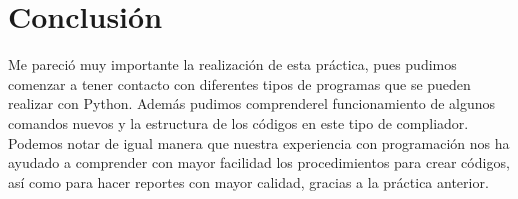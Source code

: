 \documentclass[12 pt,twocolumn]{article}
\begin{document}
\section{\small Conclusión}
Me pareció muy importante la realización de esta práctica, pues pudimos comenzar a tener contacto con diferentes tipos de programas que se pueden realizar con Python. Además pudimos comprenderel funcionamiento de algunos comandos nuevos y la estructura de los códigos en este tipo de compliador. Podemos notar de igual manera que nuestra experiencia con programación nos ha ayudado a comprender con mayor facilidad los procedimientos para crear códigos, así como para hacer reportes con mayor calidad, gracias a la práctica anterior.
\end{document}
